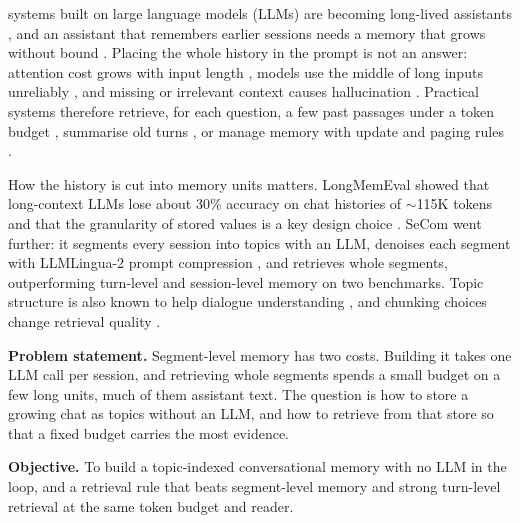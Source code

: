 \documentclass[conference]{IEEEtran}
\begin{document}
 systems built on large language models (LLMs) are
becoming long-lived assistants \cite{ni2023survey,wang2024agents}, and an
assistant that remembers earlier sessions needs a memory that grows without
bound \cite{zhang2025memory}. Placing the whole history in the prompt is not an
answer: attention cost grows with input length \cite{tay2022efficient}, models
use the middle of long inputs unreliably \cite{liu2024lost}, and missing or
irrelevant context causes hallucination \cite{huang2025hallucination}. Practical
systems therefore retrieve, for each question, a few past passages under a token
budget \cite{wu2026rag,zhao2024dense,pan2024vectordb}, summarise old turns
\cite{wang2025recursive}, or manage memory with update and paging rules
\cite{zhong2024memorybank,packer2023memgpt}.

How the history is cut into memory units matters. LongMemEval showed that
long-context LLMs lose about 30\% accuracy on chat histories of $\sim$115K tokens
and that the granularity of stored values is a key design choice
\cite{wu2025longmemeval}. SeCom \cite{pan2025secom} went further: it segments
every session into topics with an LLM, denoises each segment with LLMLingua-2
prompt compression \cite{pan2024llmlingua2}, and retrieves whole segments,
outperforming turn-level and session-level memory on two benchmarks. Topic
structure is also known to help dialogue understanding
\cite{ma2024topicaware,xu2025umlf}, and chunking choices change retrieval
quality \cite{lavarec2026chunking}.

\textbf{Problem statement.} Segment-level memory has two costs. Building it
takes one LLM call per session, and retrieving whole segments spends a small
budget on a few long units, much of them assistant text. The question is how
to store a growing chat as topics without an LLM, and how to retrieve from that
store so that a fixed budget carries the most evidence.

\textbf{Objective.} To build a topic-indexed conversational memory with no LLM
in the loop, and a retrieval rule that beats segment-level memory and strong
turn-level retrieval at the same token budget and reader.
\end{document}
